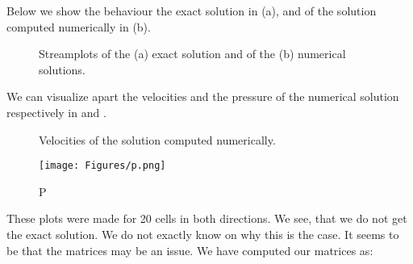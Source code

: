 Below we show the behaviour the exact solution in (a), and of the solution computed numerically in (b).

\begin{figure}[H]
    \centering
    \hfill
    \caption{Streamplots of the (a) exact solution and of the (b) numerical solutions.}
    \label{fig:streamplots}
\end{figure}



We can visualize apart the velocities and the pressure of the numerical solution respectively in  and  .

\begin{figure}[H]
    \centering
    \hfill
    \caption{Velocities of the solution computed numerically.}
    \label{fig:velocities}
\end{figure}

\begin{comment}
\begin{figure}[H]
    \centering
    \texttt{[image: Figures/U1.png]}
    \caption{U1}
    \label{fig:enter-label}
\end{figure}
and 
\begin{figure}[H]
    \centering
    \texttt{[image: Figures/U2.png]}
    \caption{U2}
    \label{fig:enter-label}
\end{figure}
\end{comment}

\begin{figure}[H]
    \centering
    \texttt{[image: Figures/p.png]}
    \caption{P}
    \label{fig:pressure}
\end{figure}

These plots were made for 20 cells in both directions. We see, that we do not get the exact solution. 
We do not exactly know on why this is the case. It seems to be that the matrices may be an issue. We have computed our matrices as: